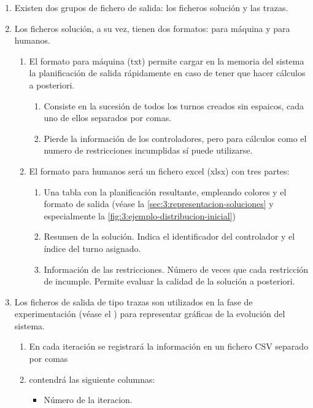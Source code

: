 \begin{enumerate}[label={\textbf{RIO\arabic*}}, ref={RIO\arabic*},  align=left]
	\item Existen dos grupos de fichero de salida: los ficheros solución y las trazas.
	\item Los ficheros solución, a su vez, tienen dos formatos: para máquina y para humanos.
	\begin{enumerate}[label*={\textbf{.\arabic*}}]
		\item El formato para máquina (txt) permite cargar en la memoria del sistema la planificación de salida rápidamente en caso de tener que hacer cálculos a posteriori.
		\begin{enumerate}[label*={\textbf{.\arabic*}}]
			\item Consiste en la sucesión de todos los turnos creados sin espaicos, cada uno de ellos separados por comas.
			\item Pierde la información de los controladores, pero para cálculos como el numero de restricciones incumplidas sí puede utilizarse.
		\end{enumerate}
		\item \label{RIO:formato-excel} El formato para humanos será un fichero excel (xlsx) con tres partes:
		\begin{enumerate}[label*={\textbf{.\arabic*}}]
			\item Una tabla con la planificación resultante, empleando colores y el formato de salida (véase la \autoref{sec:3:representacion-soluciones} y especialmente la \autoref{fig:3:ejemplo-distribucion-inicial})
			\item Resumen de la solución. Indica el identificador del controlador y el índice del turno asignado.
			\item Información de las restricciones. Número de veces que cada restricción de incumple. Permite evaluar la calidad de la solución a posteriori.
		\end{enumerate}
	\end{enumerate}
	\item \label{RIO:salida-csv} Los ficheros de salida de tipo trazas son utilizados en la fase de experimentación (véase el ) para representar gráficas de la evolución del sistema.
	\begin{enumerate}[label*={\textbf{.\arabic*}}]
		\item En cada iteración se registrará la información en un fichero CSV separado por comas
		\item contendrá las siguiente columnas:
		\begin{itemize}
			\item Número de la iteracion.

\end{itemize}
\end{enumerate}
\end{enumerate}
